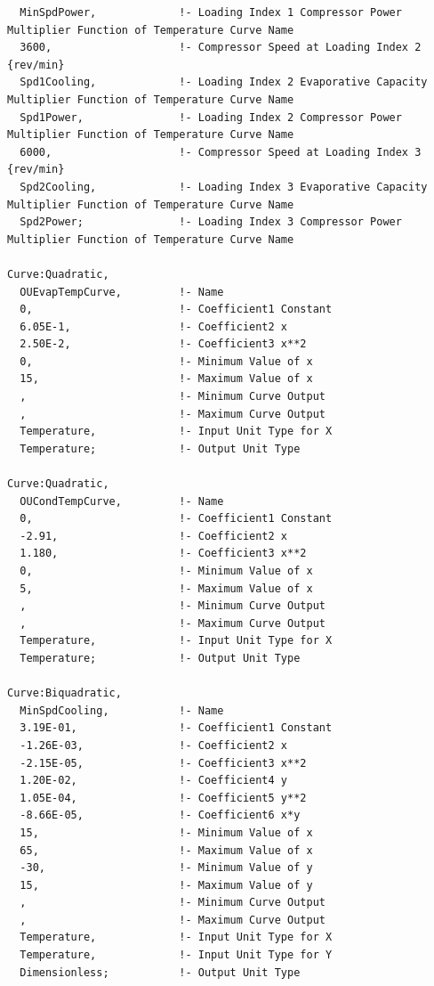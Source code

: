 \begin{lstlisting}
  MinSpdPower,             !- Loading Index 1 Compressor Power Multiplier Function of Temperature Curve Name
  3600,                    !- Compressor Speed at Loading Index 2 {rev/min}
  Spd1Cooling,             !- Loading Index 2 Evaporative Capacity Multiplier Function of Temperature Curve Name
  Spd1Power,               !- Loading Index 2 Compressor Power Multiplier Function of Temperature Curve Name
  6000,                    !- Compressor Speed at Loading Index 3 {rev/min}
  Spd2Cooling,             !- Loading Index 3 Evaporative Capacity Multiplier Function of Temperature Curve Name
  Spd2Power;               !- Loading Index 3 Compressor Power Multiplier Function of Temperature Curve Name

Curve:Quadratic,
  OUEvapTempCurve,         !- Name
  0,                       !- Coefficient1 Constant
  6.05E-1,                 !- Coefficient2 x
  2.50E-2,                 !- Coefficient3 x**2
  0,                       !- Minimum Value of x
  15,                      !- Maximum Value of x
  ,                        !- Minimum Curve Output
  ,                        !- Maximum Curve Output
  Temperature,             !- Input Unit Type for X
  Temperature;             !- Output Unit Type

Curve:Quadratic,
  OUCondTempCurve,         !- Name
  0,                       !- Coefficient1 Constant
  -2.91,                   !- Coefficient2 x
  1.180,                   !- Coefficient3 x**2
  0,                       !- Minimum Value of x
  5,                       !- Maximum Value of x
  ,                        !- Minimum Curve Output
  ,                        !- Maximum Curve Output
  Temperature,             !- Input Unit Type for X
  Temperature;             !- Output Unit Type

Curve:Biquadratic,
  MinSpdCooling,           !- Name
  3.19E-01,                !- Coefficient1 Constant
  -1.26E-03,               !- Coefficient2 x
  -2.15E-05,               !- Coefficient3 x**2
  1.20E-02,                !- Coefficient4 y
  1.05E-04,                !- Coefficient5 y**2
  -8.66E-05,               !- Coefficient6 x*y
  15,                      !- Minimum Value of x
  65,                      !- Maximum Value of x
  -30,                     !- Minimum Value of y
  15,                      !- Maximum Value of y
  ,                        !- Minimum Curve Output
  ,                        !- Maximum Curve Output
  Temperature,             !- Input Unit Type for X
  Temperature,             !- Input Unit Type for Y
  Dimensionless;           !- Output Unit Type


\end{lstlisting}
